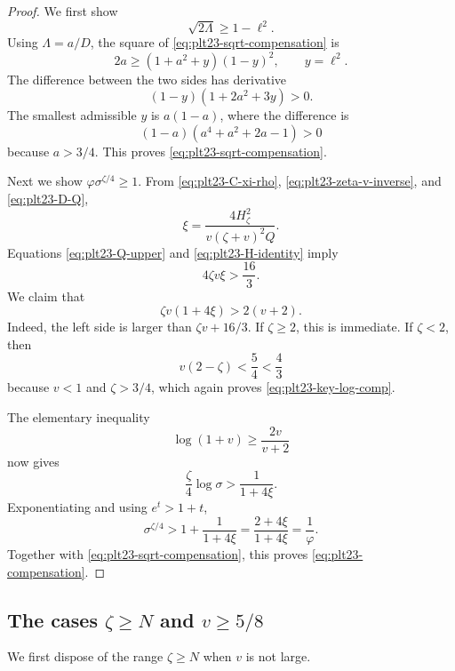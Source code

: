 \documentclass[11pt]{article}
\numberwithin{equation}{section}
\begin{document}
\begin{proof}
  We first show
  \begin{equation}\label{eq:plt23-sqrt-compensation}
    \sqrt{2\Lambda}\ge1-\ell^2.
  \end{equation}
  Using $\Lambda=a/D$, the square of \eqref{eq:plt23-sqrt-compensation} is
  \[
    2a\ge(1+a^2+y)(1-y)^2,
    \qquad y=\ell^2.
  \]
  The difference between the two sides has derivative
  \[
    (1-y)(1+2a^2+3y)>0.
  \]
  The smallest admissible $y$ is $a(1-a)$, where the difference is
  \[
    (1-a)(a^4+a^2+2a-1)>0
  \]
  because $a>3/4$.  This proves \eqref{eq:plt23-sqrt-compensation}.

  Next we show $\varphi\sigma^{\zeta/4}\ge1$.  From
  \eqref{eq:plt23-C-xi-rho}, \eqref{eq:plt23-zeta-v-inverse}, and
  \eqref{eq:plt23-D-Q},
  \begin{equation}\label{eq:plt23-xi-zeta-v}
    \xi=\frac{4H_\zeta^2}
    {v(\zeta+v)^2Q}.
  \end{equation}
  Equations \eqref{eq:plt23-Q-upper} and \eqref{eq:plt23-H-identity} imply
  \begin{equation}\label{eq:plt23-xi-comp-bound}
    4\zeta v\xi>\frac{16}{3}.
  \end{equation}
  We claim that
  \begin{equation}\label{eq:plt23-key-log-comp}
    \zeta v(1+4\xi)>2(v+2).
  \end{equation}
  Indeed, the left side is larger than $\zeta v+16/3$.  If
  $\zeta\ge2$, this is immediate.  If $\zeta<2$, then
  \[
    v(2-\zeta)<\frac{5}{4}<\frac{4}{3}
  \]
  because $v<1$ and $\zeta>3/4$, which again proves
  \eqref{eq:plt23-key-log-comp}.

  The elementary inequality
  \[
    \log(1+v)\ge\frac{2v}{v+2}
  \]
  now gives
  \[
    \frac{\zeta}{4}\log\sigma>
    \frac{1}{1+4\xi}.
  \]
  Exponentiating and using $e^t>1+t$,
  \[
    \sigma^{\zeta/4}>
    1+\frac{1}{1+4\xi}
    =\frac{2+4\xi}{1+4\xi}=\frac{1}{\varphi}.
  \]
  Together with \eqref{eq:plt23-sqrt-compensation}, this proves
  \eqref{eq:plt23-compensation}.
\end{proof}

\subsection{The cases \texorpdfstring{$\zeta\ge N$}{zeta >= N} and \texorpdfstring{$v\ge5/8$}{v >= 5/8}}

We first dispose of the range $\zeta\ge N$ when $v$ is not large.
\end{document}
